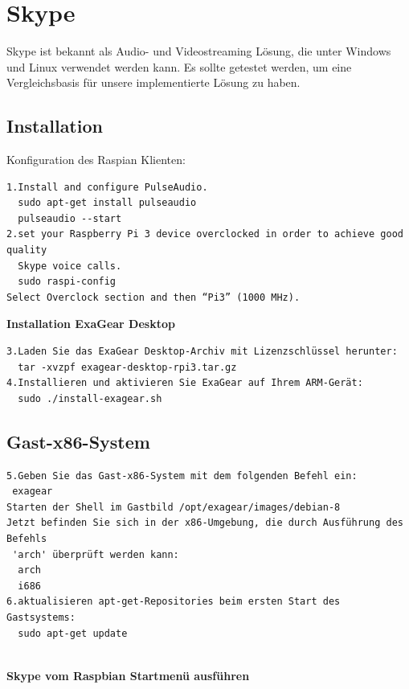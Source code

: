 \section{Skype}
Skype ist bekannt als Audio- und Videostreaming Lösung, die unter Windows und Linux verwendet werden kann. Es sollte getestet werden, um eine Vergleichsbasis für unsere implementierte Lösung zu haben.
\subsection{Installation}
Konfiguration des Raspian Klienten:
\begin{verbatim}
1.Install and configure PulseAudio.
  sudo apt-get install pulseaudio
  pulseaudio --start
2.set your Raspberry Pi 3 device overclocked in order to achieve good quality
  Skype voice calls. 
  sudo raspi-config
Select Overclock section and then “Pi3” (1000 MHz).
\end{verbatim}

\textbf{Installation ExaGear Desktop}
\begin{verbatim}
3.Laden Sie das ExaGear Desktop-Archiv mit Lizenzschlüssel herunter:
  tar -xvzpf exagear-desktop-rpi3.tar.gz
4.Installieren und aktivieren Sie ExaGear auf Ihrem ARM-Gerät:
  sudo ./install-exagear.sh	 
\end{verbatim}
\subsection{Gast-x86-System}
\begin{verbatim}
5.Geben Sie das Gast-x86-System mit dem folgenden Befehl ein:
 exagear
Starten der Shell im Gastbild /opt/exagear/images/debian-8
Jetzt befinden Sie sich in der x86-Umgebung, die durch Ausführung des Befehls
 'arch' überprüft werden kann:
  arch
  i686
6.aktualisieren apt-get-Repositories beim ersten Start des Gastsystems:
  sudo apt-get update
\end{verbatim}\\

\textbf{Skype vom Raspbian Startmenü ausführen} \\

